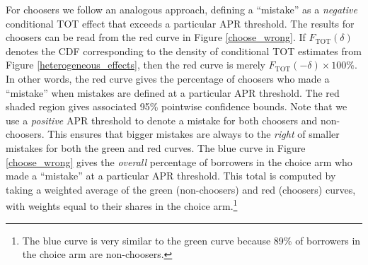 \documentclass[ecta,nameyear,final]{econsocart}
\begin{document}
For choosers we follow an analogous approach, defining a ``mistake'' as a \emph{negative} conditional TOT effect that exceeds a particular APR threshold.
The results for choosers can be read from the red curve in Figure \ref{choose_wrong}.
If $F_{\text{TOT}}(\delta)$ denotes the CDF corresponding to the density of conditional TOT estimates from Figure \ref{heterogeneous_effects}, then the red curve is merely $F_{\text{TOT}}(-\delta) \times 100\%$.
In other words, the red curve gives the percentage of choosers who made a ``mistake'' when mistakes are defined at a particular APR threshold.
The red shaded region gives associated 95\% pointwise confidence bounds.
Note that we use a \emph{positive} APR threshold to denote a mistake for both choosers and non-choosers. 
This ensures that bigger mistakes are always to the \emph{right} of smaller mistakes for both the green and red curves.
The blue curve in Figure \ref{choose_wrong} gives the \emph{overall} percentage of borrowers in the choice arm who made a ``mistake'' at a particular APR threshold.
This total is computed by taking a weighted average of the green (non-choosers) and red (choosers) curves, with weights equal to their shares in the choice arm.\footnote{The blue curve is very similar to the green curve because 89\% of borrowers in the choice arm are non-choosers.}
\end{document}
